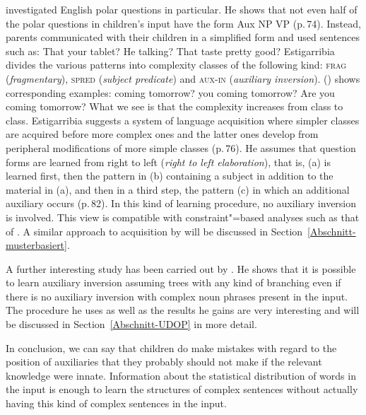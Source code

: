 \citet{Estigarribia2009a} investigated English polar questions in particular. He shows that not even half of the polar questions in children's input have
 the form Aux NP VP (p.\,74).
Instead, parents communicated with their children in a simplified form and used sentences such as:
\eal
\ex That your tablet?
\ex He talking?
\ex That taste pretty good?
\zl
Estigarribia divides the various patterns into complexity classes of the following kind:
\textsc{frag}
(\emph{fragmentary}), \textsc{spred} (\emph{subject predicate}) and \textsc{aux-in} (\emph{auxiliary
  inversion}). () shows corresponding examples:
\eal\settowidth{}
\ex coming tomorrow?         
\ex you coming tomorrow?     
\ex Are you coming tomorrow? 
\zl
What we see is that the complexity increases from class to class. Estigarribia suggests a system of language
acquisition where simpler classes are acquired before more complex ones and the latter ones develop from peripheral
modifications of more simple classes
(p.\,76). He assumes that question forms are learned from right to left
 (\emph{right to left elaboration}), that is, (a) is learned first, then the pattern in (b) containing a subject in addition to the material in (a), and
 then in a third step, the pattern (c) in which an additional auxiliary occurs (p.\,82). 
In this kind of learning procedure, no auxiliary inversion is involved. This view is compatible with constraint"=based analyses such as that of
 \citet{GSag2000a-u}. 
A similar approach to acquisition by \citet*{FPAG2007a} will be discussed in Section~\ref{Abschnitt-musterbasiert}.

A further interesting study has been carried out by \citet{Bod2009a}. He shows that it is possible to learn auxiliary inversion
assuming trees with any kind of branching even if there is no auxiliary inversion with complex noun phrases present
in the input. The procedure he uses as well as the results he gains are very interesting and will be discussed 
in Section~\ref{Abschnitt-UDOP} in more detail.

In conclusion, we can say that children do make mistakes with regard to the position of auxiliaries that they
probably should not make if the relevant knowledge were innate. Information about the statistical
distribution of words in the input is enough to learn the structures of complex sentences without
actually having this kind of complex sentences in the input.%

